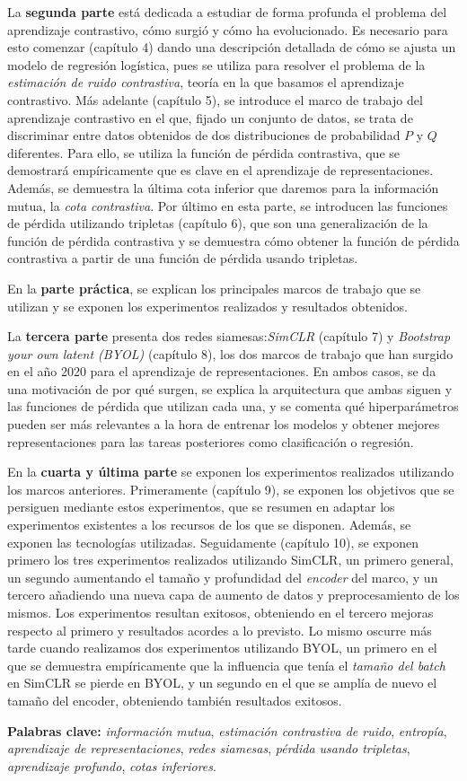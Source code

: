 La \textbf{segunda parte} está dedicada a estudiar de forma profunda el problema del aprendizaje contrastivo, cómo surgió y cómo ha evolucionado. Es necesario para esto comenzar (capítulo 4) dando una descripción detallada de cómo se ajusta un modelo de regresión logística, pues se utiliza para resolver el problema de la \emph{estimación de ruido contrastiva}, teoría en la que basamos el aprendizaje contrastivo. Más adelante (capítulo 5), se introduce el marco de trabajo del aprendizaje contrastivo en el que, fijado un conjunto de datos, se trata de discriminar entre datos obtenidos de dos distribuciones de probabilidad $P$ y $Q$ diferentes. Para ello, se utiliza la función de pérdida contrastiva, que se demostrará empíricamente que es clave en el aprendizaje de representaciones. Además, se demuestra la última cota inferior que daremos para la información mutua, la \emph{cota contrastiva}. Por último en esta parte, se introducen las funciones de pérdida utilizando tripletas (capítulo 6), que son una generalización de la función de pérdida contrastiva y se demuestra cómo obtener la función de pérdida contrastiva a partir de una función de pérdida usando tripletas.

En la \textbf{parte práctica}, se explican los principales marcos de trabajo que se utilizan y se exponen los experimentos realizados y resultados obtenidos.

La \textbf{tercera parte} presenta dos redes siamesas:\emph{SimCLR} (capítulo 7) y \emph{Bootstrap your own latent (BYOL)} (capítulo 8), los dos marcos de trabajo que han surgido en el año 2020 para el aprendizaje de representaciones. En ambos casos, se da una motivación de por qué surgen, se explica la arquitectura que ambas siguen y las funciones de pérdida que utilizan cada una, y se comenta qué hiperparámetros pueden ser más relevantes a la hora de entrenar los modelos y obtener mejores representaciones para las tareas posteriores como clasificación o regresión.

En la \textbf{cuarta y última parte} se exponen los experimentos realizados utilizando los marcos anteriores. Primeramente (capítulo 9), se exponen los objetivos que se persiguen mediante estos experimentos, que se resumen en adaptar los experimentos existentes a los recursos de los que se disponen. Además, se exponen las tecnologías utilizadas. Seguidamente (capítulo 10), se exponen primero los tres experimentos realizados utilizando SimCLR, un primero general, un segundo aumentando el tamaño y profundidad del \emph{encoder} del marco, y un tercero añadiendo una nueva capa de aumento de datos y preprocesamiento de los mismos. Los experimentos resultan exitosos, obteniendo en el tercero mejoras respecto al primero y resultados acordes a lo previsto. Lo mismo oscurre más tarde cuando realizamos dos experimentos utilizando BYOL, un primero en el que se demuestra empíricamente que la influencia que tenía el \emph{tamaño del batch} en SimCLR se pierde en BYOL, y un segundo en el que se amplía de nuevo el tamaño del encoder, obteniendo también resultados exitosos.

\textbf{Palabras clave:} \emph{información mutua}, \emph{estimación contrastiva de ruido}, \emph{entropía}, \emph{aprendizaje de representaciones}, \emph{redes siamesas}, \emph{pérdida usando tripletas}, \emph{aprendizaje profundo}, \emph{cotas inferiores}.
